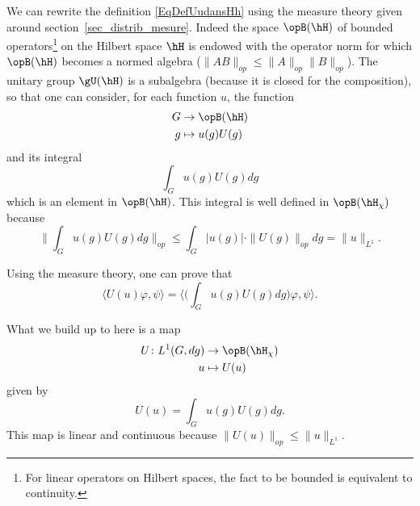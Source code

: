 We can rewrite the definition \eqref{EqDefUudansHh} using the measure theory given around section~\ref{sec_distrib_mesure}. Indeed the space $\opB(\hH)$ of bounded operators\footnote{For linear operators on Hilbert spaces, the fact to be bounded is equivalent to continuity.} on the Hilbert space $\hH$ is endowed with the operator norm for which $\opB(\hH)$ becomes a normed algebra ($\| AB \|_{op}\leq\| A \|_{op}\| B \|_{op}$). The unitary group $\gU(\hH)$ is a subalgebra (because it is closed for the composition), so that one can consider, for each function $u$, the function
\begin{equation}
	\begin{aligned}
		G&\to \opB(\hH) \\
		g&\mapsto u(g)U(g)
	\end{aligned}
\end{equation}
and its integral
\begin{equation}
	\int_G u(g)U(g)dg
\end{equation}
which is an element in $\opB(\hH)$. This integral is well defined in $\opB(\hH_{\chi})$ because
\begin{equation}
	\| \int_G u(g)U(g)dg \|_{op}\leq\int_G | u(g) |\cdot \| U(g) \|_{op}dg=\| u \|_{L^1}.
\end{equation}

Using the measure theory, one can prove that
\begin{equation}
	\langle U(u)\varphi, \psi\rangle =\langle  \big( \int_G u(g)U(g)dg \big)\varphi , \psi\rangle.
\end{equation}

What we build up to here is a map
\begin{equation}
	\begin{aligned}
		U\colon L^1(G,dg)&\to \opB(\hH_{\chi}) \\
		u&\mapsto U(u)
	\end{aligned}
\end{equation}
given by
\begin{equation}
	U(u)=\int_G u(g)U(g)dg.
\end{equation}
This map is linear and continuous because $\| U(u) \|_{op}\leq\| u \|_{L^1}$.


